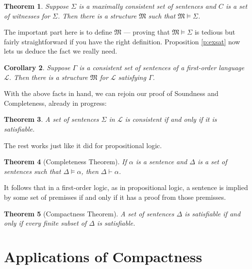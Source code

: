 \documentclass[12pt]{amsbook}
\newcommand{\proves}{\vdash}
\theoremstyle{plain}
\newtheorem{thm}{Theorem}[chapter]
\newtheorem{cor}[thm]{Corollary}
\theoremstyle{definition}
\theoremstyle{remark}
\begin{document}
\begin{thm} \label{t:mfc}
Suppose $\Sigma$ is a maximally consistent set of sentences and $C$ is a set of witnesses for $\Sigma$.  Then there is a structure $\mathfrak{M}$ such that $\mathfrak{M} \models \Sigma$.  
\end{thm}

The important part here is to define $\mathfrak{M}$ --- proving that $\mathfrak{M} \models \Sigma$ is tedious but fairly straightforward if you have the right definition.  Proposition \ref{p:exsat} now lets us deduce the fact we really need.

\begin{cor} \label{p:eight17}
Suppose $\Gamma$ is a consistent set of sentences of a first-order language $\mathcal{L}$.  Then there is a structure $\mathfrak{M}$ for $\mathcal{L}$ satisfying $\Gamma$.
\end{cor}

With the above facts in hand,  we can rejoin our proof of Soundness and Completeness,  already in progress:

\begin{thm} \label{t:sacof}
A set of sentences $\Sigma$ in $\mathcal{L}$ is consistent if and only if it is satisfiable.
\end{thm}

The rest works just like it did for propositional logic.

\begin{thm}[Completeness Theorem] \label{t:fcmpl} 
If $\alpha$ is a sentence and $\Delta$ is a set of sentences such that $\Delta \models \alpha$,  then $\Delta \proves \alpha$.
\end{thm}

It follows that in a first-order logic,  as in propositional logic,  a sentence is implied by some set of premisses if and only if it has a proof from those premisses.

\begin{thm}[Compactness Theorem] \label{p:fcmpct} 
A set of sentences $\Delta$ is satisfiable if and only if every finite subset of $\Delta$ is satisfiable.
\end{thm}


%
%

\chapter{Applications of Compactness} \label{ch:nine} 
\end{document}
